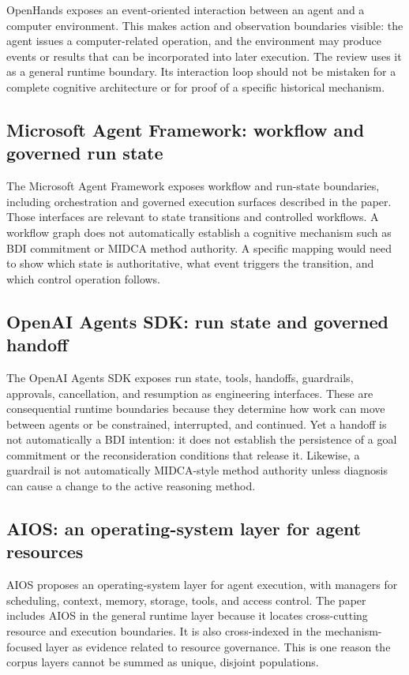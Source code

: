 OpenHands exposes an event-oriented interaction between an agent and a computer environment. This makes action and observation boundaries visible: the agent issues a computer-related operation, and the environment may produce events or results that can be incorporated into later execution. The review uses it as a general runtime boundary. Its interaction loop should not be mistaken for a complete cognitive architecture or for proof of a specific historical mechanism.

\subsection{Microsoft Agent Framework: workflow and governed run state}

The Microsoft Agent Framework exposes workflow and run-state boundaries, including orchestration and governed execution surfaces described in the paper. Those interfaces are relevant to state transitions and controlled workflows. A workflow graph does not automatically establish a cognitive mechanism such as BDI commitment or MIDCA method authority. A specific mapping would need to show which state is authoritative, what event triggers the transition, and which control operation follows.

\subsection{OpenAI Agents SDK: run state and governed handoff}

The OpenAI Agents SDK exposes run state, tools, handoffs, guardrails, approvals, cancellation, and resumption as engineering interfaces. These are consequential runtime boundaries because they determine how work can move between agents or be constrained, interrupted, and continued. Yet a handoff is not automatically a BDI intention: it does not establish the persistence of a goal commitment or the reconsideration conditions that release it. Likewise, a guardrail is not automatically MIDCA-style method authority unless diagnosis can cause a change to the active reasoning method.

\subsection{AIOS: an operating-system layer for agent resources}

AIOS proposes an operating-system layer for agent execution, with managers for scheduling, context, memory, storage, tools, and access control. The paper includes AIOS in the general runtime layer because it locates cross-cutting resource and execution boundaries. It is also cross-indexed in the mechanism-focused layer as evidence related to resource governance. This is one reason the corpus layers cannot be summed as unique, disjoint populations.

